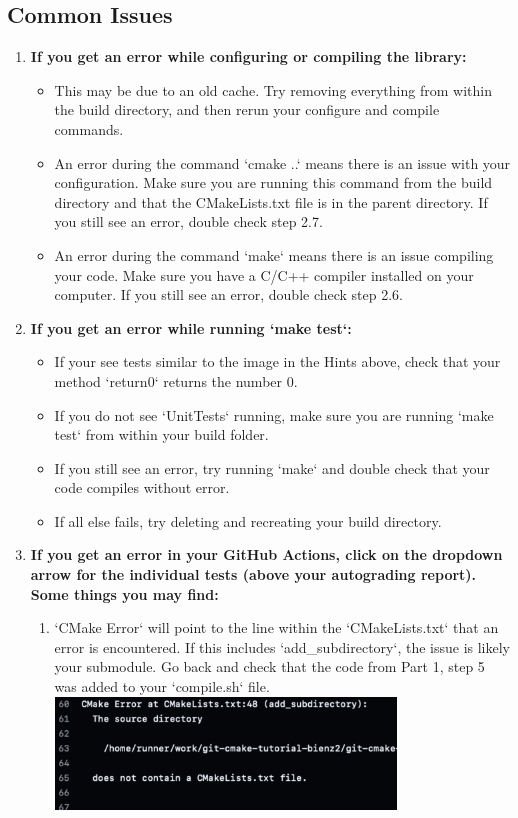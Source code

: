 \documentclass{article} %
\begin{document}
\subsection*{Common Issues}
\begin{enumerate}
    \item \textbf{If you get an error while configuring or compiling the library:}
    \begin{itemize}
        \item This may be due to an old cache.  Try removing everything from within the build directory, and then rerun your configure and compile commands.
        \item An error during the command `cmake ..` means there is an issue with your configuration.  Make sure you are running this command from the build directory and that the CMakeLists.txt file is in the parent directory.  If you still see an error, double check step 2.7.
        \item An error during the command `make` means there is an issue compiling your code.  Make sure you have a C/C++ compiler installed on your computer.  If you still see an error, double check step 2.6.
    \end{itemize}

    \item \textbf{If you get an error while running `make test`:}
    \begin{itemize}
        \item If your see tests similar to the image in the Hints above, check that your method `return0` returns the number 0.
        \item If you do not see `UnitTests` running, make sure you are running `make test` from within your build folder.
        \item If you still see an error, try running `make` and double check that your code compiles without error.
        \item If all else fails, try deleting and recreating your build directory.
    \end{itemize}

    \item \textbf{If you get an error in your GitHub Actions, click on the dropdown arrow for the individual tests (above your autograding report).  Some things you may find:}
    \begin{enumerate}
        \item `CMake Error` will point to the line within the `CMakeLists.txt` that an error is encountered.  If this includes `add\_subdirectory`, the issue is likely your submodule.  Go back and check that the code from Part 1, step 5 was added to your `compile.sh` file.\\
        \includegraphics[width=0.75\textwidth]{figs/error_submodule.png}


\end{enumerate}
\end{enumerate}
\end{document}

